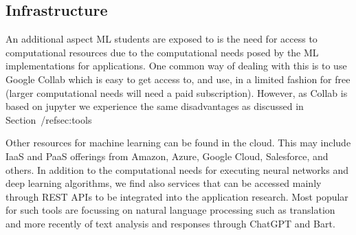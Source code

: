 \documentclass[utf8]{FrontiersinVancouver} %
\begin{document}
\subsection{Infrastructure}

An additional aspect ML students are exposed to is the need for access
to computational resources due to the computational needs posed by the
ML implementations for applications. One common way of dealing with
this is to use Google Collab which is easy to get access to, and use,
in a limited fashion for free (larger computational needs will need a
paid subscription).  However, as Collab is based on jupyter we
experience the same disadvantages as discussed in
Section~/ref{sec:tools}

Other resources for machine learning can be found in the cloud. This
may include IaaS and PaaS offerings from Amazon, Azure, Google Cloud,
Salesforce, and others.  In addition to the computational needs for
executing neural networks and deep learning algorithms, we find also
services that can be accessed mainly through REST APIs to be
integrated into the application research. Most popular for such tools
are focussing on natural language processing such as translation and
more recently of text analysis and responses through ChatGPT and Bart.
\end{document}
